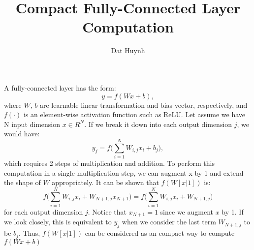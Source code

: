 \documentclass[11pt]{article} %
\title{Compact Fully-Connected Layer Computation}
\author{Dat Huynh}
\begin{document}
\maketitle

A fully-connected layer has the form: 
\begin{equation}
y = f(Wx+b), 
\end{equation}
where $W$, $b$ are learnable linear transformation and bias vector, respectively, and $f(\cdot)$ is an element-wise activation function such as ReLU. 
Let assume we have N input dimension $x\in R^N$. If we break it down into each output dimension $j$, we would have:
\begin{equation}
y_j = f\Big(\sum^{N}_{i=1}W_{i,j} x_i + b_j\Big),
\end{equation}
which requires 2 steps of multiplication and addition.
To perform this computation in a single multiplication step, we can augment x by 1 and extend the shape of $W$ appropriately. 
It can be shown that $f(W[x|1])$ is:
\begin{equation} 
f\Big(\sum^{N}_{i=1}W_{i,j} x_i + W_{N+1,j}x_{N+1}\Big) = f\Big(\sum^{N}_{i=1}W_{i,j} x_i + W_{N+1,j}\Big)
\end{equation}
for each output dimension $j$. Notice that $x_{N+1}=1$ since we augment $x$ by 1.
If we look closely, this is equivalent to $y_j$ when we consider the last term $W_{N+1,j}$ to be $b_j$. Thus, $f(W[x|1])$ can be considered as an compact way to compute $f(Wx+b)$
\end{document}

